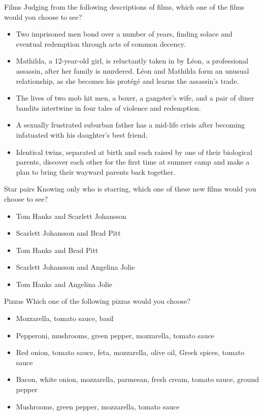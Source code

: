 \documentclass{beamer}
\begin{document}
\begin{frame}{Films}
Judging from the following descriptions of films, which one of the films would you choose to see?

\begin{itemize}
	\item Two imprisoned men bond over a number of years, finding solace and
eventual redemption through acts of common decency. \\
	\item Mathilda, a 12-year-old girl, is reluctantly taken in by L\'eon, a
professional assassin, after her family is murdered. L\'eon and Mathilda
form an unusual relationship, as she becomes his prot\'eg\'e and learns the
assassin's trade. \\
	\item The lives of two mob hit men, a boxer, a gangster's wife, and a pair
of diner bandits intertwine in four tales of violence and redemption. \\
	\item A sexually frustrated suburban father has a mid-life crisis after
becoming infatuated with his daughter's best friend. \\
	\item Identical twins, separated at birth and each raised by one of their
biological parents, discover each other for the first time at summer camp
and make a plan to bring their wayward parents back together.
\end{itemize}
\end{frame}

\begin{frame}{Star pairs}
Knowing only who is starring, which one of these new films would you choose to see?

\begin{itemize}
	\item Tom Hanks and Scarlett Johansson
	\item Scarlett Johansson and Brad Pitt
	\item Tom Hanks and Brad Pitt
	\item Scarlett Johansson and Angelina Jolie
	\item Tom Hanks and Angelina Jolie
\end{itemize}
\end{frame}

\begin{frame}{Pizzas}
Which one of the following pizzas would you choose?

\begin{itemize}
	\item Mozzarella, tomato sauce, basil
	\item Pepperoni, mushrooms, green pepper, mozzarella, tomato sauce
	\item Red onion, tomato sauce, feta, mozzarella, olive oil, Greek spices,
tomato sauce
	\item Bacon, white onion, mozzarella, parmesan, fresh cream, tomato sauce,
ground pepper
	\item Mushrooms, green pepper, mozzarella, tomato sauce
\end{itemize}
\end{frame}
\end{document}
